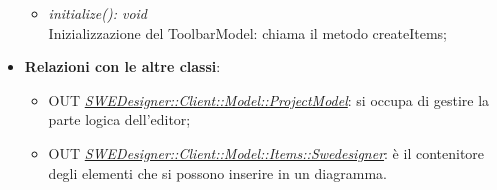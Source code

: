 \documentclass[../DefinizioneDiProdotto.tex]{subfiles}
\begin{document}
\begin{itemize}
\begin{itemize}
							\item \emph{initialize(): void} \\
							Inizializzazione del ToolbarModel: chiama il metodo createItems;
						\end{itemize}
						\item \textbf{Relazioni con le altre classi}:
						\begin{itemize}
							\item OUT \hyperlink{SWEDesigner::Client::Model::ProjectModel}{\emph{SWEDesigner::Client::Model::ProjectModel}}: si occupa di gestire la parte logica dell'editor;
							\item OUT \hyperlink{SWEDesigner::Client::Model::Items::Swedesigner}{\emph{SWEDesigner::Client::Model::Items::Swedesigner}}: è il contenitore degli elementi che si possono inserire in un diagramma.
						\end{itemize}
					\end{itemize}
\end{document}
